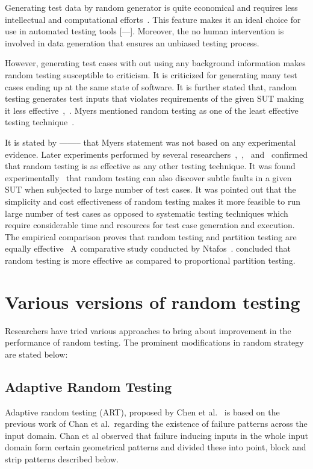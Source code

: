 Generating test data by random generator is quite economical and requires less intellectual and computational efforts~\cite{Ciupa2008a}. This feature makes it an ideal choice for use in automated testing tools [---]. Moreover, the no human intervention is involved in data generation that ensures an unbiased testing process.

However, generating test cases with out using any background information makes random testing susceptible to criticism. It is criticized for generating many test cases ending up at the same state of software. It is further stated that, random testing generates test inputs that violates requirements of the given SUT making it less effective~\cite{sen2007effective},~\cite{pacheco2009directed}. Myers mentioned random testing as one of the least effective testing technique~\cite{Myers1979}.

It is stated by -------- that Myers statement was not based on any experimental evidence. Later experiments performed by several researchers~\cite{hamlet1994},~\cite{Ciupa2008},~\cite{leitner2007efficient} and~\cite{Duran1981} confirmed that random testing is as effective as any other testing technique. It was found experimentally~\cite{Duran1981} that random testing can also discover subtle faults in a given SUT when subjected to large number of test cases. It was pointed out that the simplicity and cost effectiveness of random testing makes it more feasible to run large number of test cases as opposed to systematic testing techniques which require considerable time and resources for test case generation and execution. The empirical comparison proves that random testing and partition testing are equally effective~\cite{hamlet1990} A comparative study conducted by Ntafos~\cite{ntafos1998random}. concluded that random testing is more effective as compared to proportional partition testing.


\section{Various versions of random testing}
Researchers have tried various approaches to bring about improvement in the performance of random testing. The prominent modifications in random strategy are stated below:

\subsection{Adaptive Random Testing}
Adaptive random testing (ART), proposed by Chen et al.~\cite{Chen2008} is based on the previous work of Chan et al.~\cite{Chan1996}regarding the existence of failure patterns across the input domain. Chan et al observed that failure inducing inputs in the whole input domain form certain geometrical patterns and divided these into point, block and strip patterns described below.

